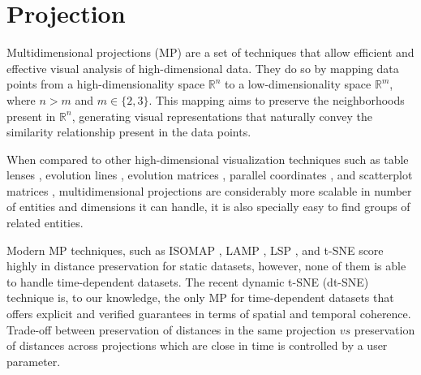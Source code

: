 \section{Projection} \label{sec:proj}
Multidimensional projections (MP) are a set of techniques that allow efficient and effective visual analysis of high-dimensional data. They do so by mapping data points from a high-dimensionality space ${\mathbb{R}^{n}}$ to a low-dimensionality space $\mathbb{R}^{m}$, where ${n > m}$ and ${m \in \{2,3\}}$. This mapping aims to preserve the neighborhoods present in  ${\mathbb{R}^{n}}$, generating visual representations that naturally convey the similarity relationship present in the data points.

When compared to other high-dimensional visualization techniques such as table lenses \cite{ref:solid}, evolution lines \cite{ref:evolines}, evolution matrices \cite{ref:evomat}, parallel coordinates \cite{ref:parallelcoords}, and scatterplot matrices \cite{ref:scatter}, multidimensional projections are considerably more scalable in number of entities and dimensions it can handle, it is also specially easy to find groups of related entities.

Modern MP techniques, such as ISOMAP \cite{ref:tenenbaum2000ISOMAP}, LAMP \cite{joia2011LAMP}, LSP \cite{paulovich2008LSP}, and t-SNE \cite{maaten2008tsne} score highly in distance preservation for static datasets, however, none of them is able to handle time-dependent datasets. The recent dynamic t-SNE (dt-SNE) \cite{ref:dtsne} technique is, to our knowledge, the only MP for time-dependent datasets that offers explicit and verified guarantees in terms of spatial and temporal coherence. Trade-off between preservation of distances in the same projection $vs$ preservation of distances across projections which are close in time is controlled by a user parameter.

